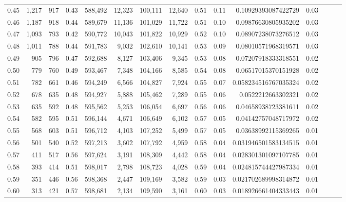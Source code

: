 \begin{tabular}{rrrrrrrrrrrrrrr}
0.45 &   1,217 &    917 &  0.43 &  588,492 &   12,323 &  100,111 &   12,640 &  0.51 &  0.11 &     0.10929393087422729 &      0.03 \\
0.46 &   1,187 &    918 &  0.44 &  589,679 &   11,136 &  101,029 &   11,722 &  0.51 &  0.10 &     0.09876630805935202 &      0.03 \\
0.47 &   1,093 &    793 &  0.42 &  590,772 &   10,043 &  101,822 &   10,929 &  0.52 &  0.10 &     0.08907238073276512 &      0.03 \\
0.48 &   1,011 &    788 &  0.44 &  591,783 &    9,032 &  102,610 &   10,141 &  0.53 &  0.09 &     0.08010571968319571 &      0.03 \\
0.49 &     905 &    796 &  0.47 &  592,688 &    8,127 &  103,406 &    9,345 &  0.53 &  0.08 &     0.07207918333318551 &      0.02 \\
0.50 &     779 &    760 &  0.49 &  593,467 &    7,348 &  104,166 &    8,585 &  0.54 &  0.08 &     0.06517015370151928 &      0.02 \\
0.51 &     782 &    661 &  0.46 &  594,249 &    6,566 &  104,827 &    7,924 &  0.55 &  0.07 &    0.058234516767035324 &      0.02 \\
0.52 &     678 &    635 &  0.48 &  594,927 &    5,888 &  105,462 &    7,289 &  0.55 &  0.06 &      0.0522212663302321 &      0.02 \\
0.53 &     635 &    592 &  0.48 &  595,562 &    5,253 &  106,054 &    6,697 &  0.56 &  0.06 &     0.04658938723381611 &      0.02 \\
0.54 &     582 &    595 &  0.51 &  596,144 &    4,671 &  106,649 &    6,102 &  0.57 &  0.05 &     0.04142757048717972 &      0.02 \\
0.55 &     568 &    603 &  0.51 &  596,712 &    4,103 &  107,252 &    5,499 &  0.57 &  0.05 &     0.03638992115369265 &      0.01 \\
0.56 &     501 &    540 &  0.52 &  597,213 &    3,602 &  107,792 &    4,959 &  0.58 &  0.04 &    0.031946501583134515 &      0.01 \\
0.57 &     411 &    517 &  0.56 &  597,624 &    3,191 &  108,309 &    4,442 &  0.58 &  0.04 &    0.028301301097107785 &      0.01 \\
0.58 &     393 &    414 &  0.51 &  598,017 &    2,798 &  108,723 &    4,028 &  0.59 &  0.04 &    0.024815744427987334 &      0.01 \\
0.59 &     351 &    446 &  0.56 &  598,368 &    2,447 &  109,169 &    3,582 &  0.59 &  0.03 &    0.021702689998314872 &      0.01 \\
0.60 &     313 &    421 &  0.57 &  598,681 &    2,134 &  109,590 &    3,161 &  0.60 &  0.03 &    0.018926661404333443 &      0.01 \\

\end{tabular}
